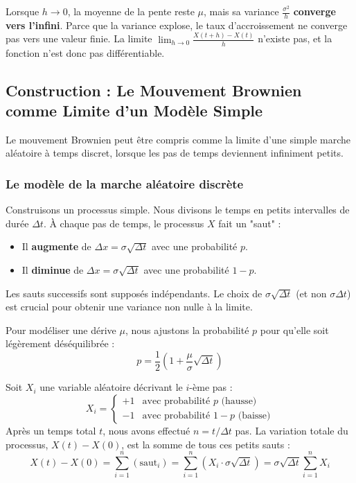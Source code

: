Lorsque $h \to 0$, la moyenne de la pente reste $\mu$, mais sa variance $\frac{\sigma^2}{h}$ \textbf{converge vers l'infini}.
Parce que la variance explose, le taux d'accroissement ne converge pas vers une valeur finie. La limite $\lim_{h \to 0} \frac{X(t+h) - X(t)}{h}$ n'existe pas, et la fonction n'est donc pas différentiable.

\subsection{Construction : Le Mouvement Brownien comme Limite d'un Modèle Simple}

Le mouvement Brownien peut être compris comme la limite d'une simple marche aléatoire à temps discret, lorsque les pas de temps deviennent infiniment petits.

\subsubsection{Le modèle de la marche aléatoire discrète}

Construisons un processus simple. Nous divisons le temps en petits intervalles de durée $\Delta t$. À chaque pas de temps, le processus $X$ fait un "saut" :
\begin{itemize}
    \item Il \textbf{augmente} de $\Delta x = \sigma\sqrt{\Delta t}$ avec une probabilité $p$.
    \item Il \textbf{diminue} de $\Delta x = \sigma\sqrt{\Delta t}$ avec une probabilité $1-p$.
\end{itemize}
Les sauts successifs sont supposés indépendants. Le choix de $\sigma\sqrt{\Delta t}$ (et non $\sigma \Delta t$) est crucial pour obtenir une variance non nulle à la limite.

Pour modéliser une dérive $\mu$, nous ajustons la probabilité $p$ pour qu'elle soit légèrement déséquilibrée :
$$ p = \frac{1}{2} \left( 1 + \frac{\mu}{\sigma} \sqrt{\Delta t} \right) $$

Soit $X_i$ une variable aléatoire décrivant le $i$-ème pas :
$$ X_i = \begin{cases} +1 & \text{avec probabilité } p \text{ (hausse)} \\ -1 & \text{avec probabilité } 1-p \text{ (baisse)} \end{cases} $$
Après un temps total $t$, nous avons effectué $n = t / \Delta t$ pas.
La variation totale du processus, $X(t) - X(0)$, est la somme de tous ces petits sauts :
$$ X(t) - X(0) = \sum_{i=1}^{n} (\text{saut}_i) = \sum_{i=1}^{n} (X_i \cdot \sigma\sqrt{\Delta t}) = \sigma\sqrt{\Delta t} \sum_{i=1}^{n} X_i $$

